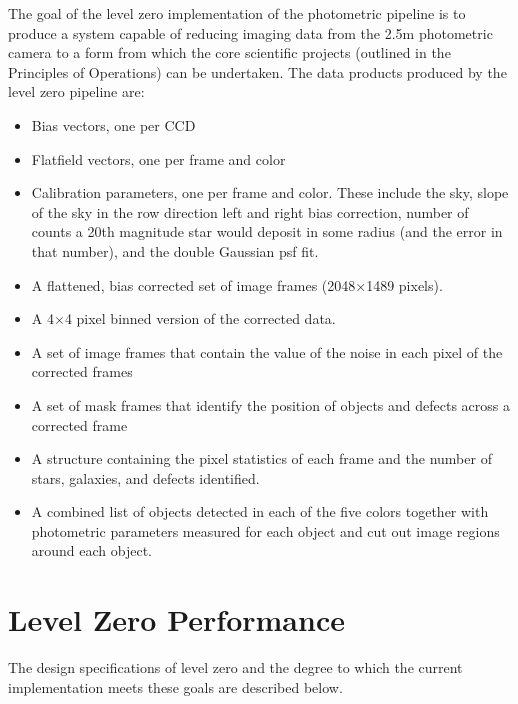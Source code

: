 	The goal of the level zero implementation of the photometric pipeline
is to produce a system capable of reducing imaging data from the 2.5m
photometric camera to a form from which the core scientific projects
(outlined in the Principles of Operations) can be undertaken. The
data products produced by the level zero pipeline are:

\begin{itemize}

\item Bias vectors, one per CCD

\item Flatfield vectors, one per frame and color

\item Calibration parameters, one per frame and color.  These include the
sky, slope of the sky in the row direction left and right bias correction,
number of counts a 20th magnitude star would deposit in some radius (and
the error in that number), and the double Gaussian psf fit.

\item A flattened, bias corrected set of image frames
(2048$\times$1489 pixels).

\item A 4$\times$4 pixel binned version of the corrected data.

\item A set of image frames that contain the value of the noise in
each pixel of the corrected frames

\item A set of mask frames that identify the position of objects and
defects across a corrected frame

\item A structure containing the pixel statistics of each frame and the number
of stars, galaxies, and defects identified.

\item A combined list of objects detected in each of the five colors
together with photometric parameters measured for each object and cut
out image regions around each object.
\end{itemize}


\section{Level Zero Performance}

The design specifications of level zero and the degree to which the
current implementation meets these goals are described below.

